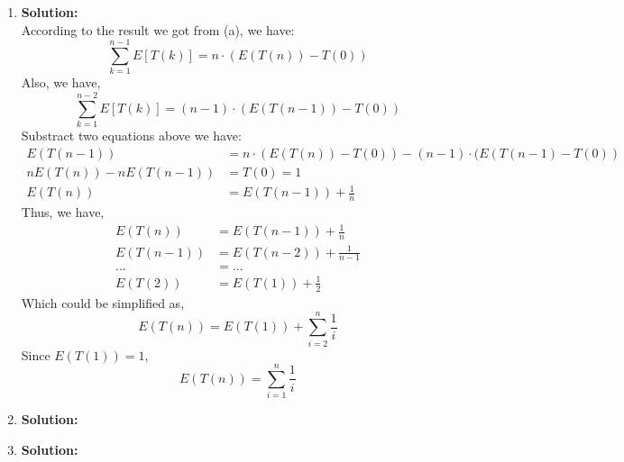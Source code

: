 \begin{enumerate}[label=(\alph*)]
	\item 
		\textbf{Solution:} \\
		According to the result we got from (a), we have:
		$$ \sum_{k = 1}^{n - 1}E[T(k)] = n \cdot (E(T(n)) - T(0)) $$
		Also, we have,
		$$ \sum_{k = 1}^{n - 2}E[T(k)] = (n - 1) \cdot (E(T(n - 1)) - T(0)) $$
		Substract two equations above we have:
		\begin{align*}
		E(T(n - 1)) &= n \cdot (E(T(n)) - T(0)) - (n - 1) \cdot (E(T(n - 1) - T(0))\\
		nE(T(n)) - nE(T(n - 1)) &= T(0) = 1\\
		E(T(n)) &= E(T(n - 1)) + \frac{1}{n}
		\end{align*}
		Thus, we have,
		\begin{align*}
		E(T(n)) &= E(T(n - 1)) + \frac{1}{n}\\
		E(T(n - 1)) &= E(T(n - 2)) + \frac{1}{n - 1}\\
		... &= ...\\
		E(T(2)) &= E(T(1)) + \frac{1}{2}
		\end{align*}
		Which could be simplified as, 
		$$ E(T(n)) = E(T(1)) + \sum_{i = 2}^{n} \frac{1}{i} $$
		Since $ E(T(1)) = 1 $,
		$$ E(T(n)) = \sum_{i = 1}^{n} \frac{1}{i} $$
	\item 
		\textbf{Solution:} \\
	\item 
		\textbf{Solution:} \\
\end{enumerate}